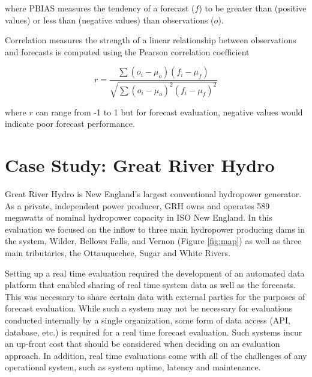\documentclass[MLA,Times1COL, hidelinks, doublespace]{WileyNJDv5} %
\begin{document}
where $\text{PBIAS}$ measures the tendency of a forecast ($f$) to be greater than (positive values) or less than (negative values) than observations ($o$). 

Correlation measures the strength of a linear relationship between observations and forecasts is computed using the Pearson correlation coefficient

\begin{equation}
    r = \frac{\sum(o_i-\mu_o)(f_i-\mu_f)}{\sqrt{\sum(o_i-\mu_o)^2(f_i-\mu_f)^2}}
\end{equation}

where $r$ can range from -1 to 1 but for forecast evaluation, negative values would indicate poor forecast performance. 


\section{Case Study: Great River Hydro}

Great River Hydro is New England’s largest conventional hydropower generator. As a private, independent power producer, GRH owns and operates 589 megawatts of nominal hydropower capacity in ISO New England. In this evaluation we focused on the inflow to three main hydropower producing dams in the system, Wilder, Bellows Falls, and Vernon (Figure \ref{fig:map}) as well as three main tributaries, the Ottauquechee, Sugar and White Rivers. 

Setting up a real time evaluation required the development of an automated data platform that enabled sharing of real time system data as well as the forecasts. This was necessary to share certain data with external parties for the purposes of forecast evaluation. While such a system may not be necessary for evaluations conducted internally by a single organization, some form of data access (API, database, etc.) is required for a real time forecast evaluation. Such systems incur an up-front cost that should be considered when deciding on an evaluation approach. In addition, real time evaluations come with all of the challenges of any operational system, such as system uptime, latency and maintenance. 

\end{document}
